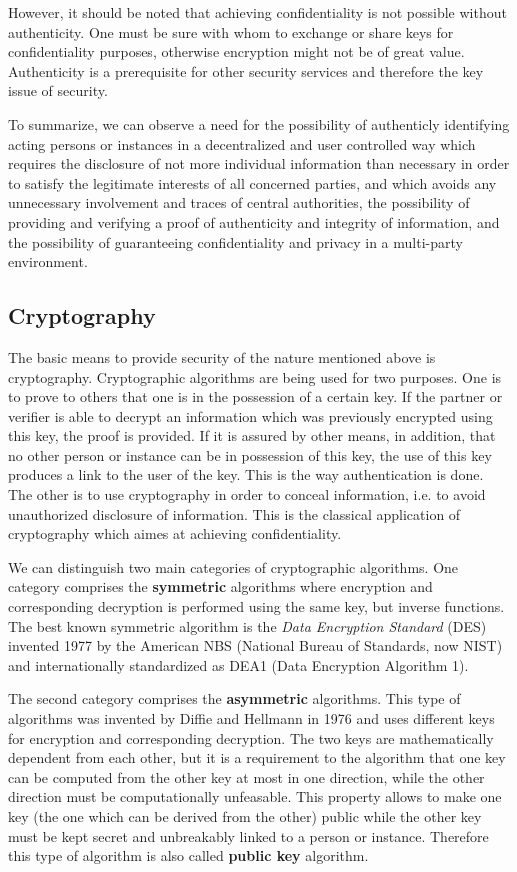 However, it should be noted that achieving confidentiality is not possible without
authenticity. One must be sure with whom to exchange or share keys for confidentiality
purposes, otherwise encryption might not be of great value. Authenticity is a
prerequisite for other security services and therefore the key issue of security.

To summarize, we can observe a need for
\bi
\m the possibility of authenticly identifying acting persons or instances in 
   a decentralized and user controlled way which requires the disclosure of
   not more individual information than necessary in order to satisfy the legitimate
   interests of all concerned parties, and which avoids any unnecessary involvement
   and traces of central authorities,
\m the possibility of providing and verifying a proof of authenticity and integrity
   of information,
\m and the possibility of guaranteeing confidentiality and privacy in
   a multi-party environment.
\ei

\subsection{Cryptography}
The basic means to provide security of the nature mentioned above is cryptography.
Cryptographic algorithms are being used for two purposes. One is to prove to others that
one is in the possession of a certain key. If the partner or verifier is able to decrypt
an information which was previously encrypted using this key, the proof is provided.
If it is assured by other means, in addition, that no other person or instance can
be in possession of this key, the use of this key produces a link to the user of the key.
This is the way authentication is done. The other is to use cryptography in order
to conceal information, i.e. to avoid unauthorized disclosure of information.
This is the classical application of cryptography which aimes at achieving confidentiality. 

We can distinguish two main categories of cryptographic algorithms. One category
comprises the {\bf symmetric} algorithms where encryption and corresponding decryption is performed 
using the same key, but inverse functions. The best known symmetric algorithm is the
{\em Data Encryption Standard} (DES) invented 1977 by the American NBS (National Bureau of
Standards, now NIST) and internationally standardized as DEA1 (Data Encryption Algorithm 1).

The second category comprises the {\bf asymmetric} algorithms. This type of algorithms was invented by Diffie and Hellmann in 1976 
and uses different keys for encryption
and corresponding decryption. The two keys are mathematically dependent
from each other, but it is a requirement to the algorithm that one key can be computed 
from the other key at most in one direction, while the other direction must be 
computationally unfeasable. This property allows to make one key 
(the one which can be derived from the other) public while the other key must be kept secret
and unbreakably linked to a person or instance. Therefore this type of algorithm is also
called {\bf public key} algorithm. 

